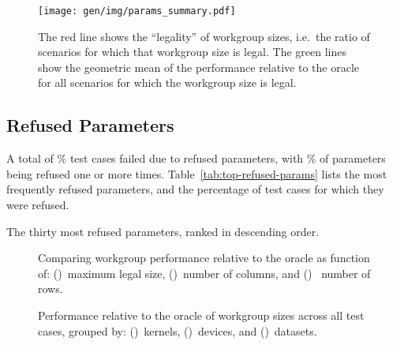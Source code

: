 \begin{figure}
\centering
\texttt{[image: gen/img/params\_summary.pdf]}
\caption{%
  The red line shows the ``legality'' of workgroup sizes, i.e.\ the
  ratio of scenarios for which that workgroup size is legal.  The
  green lines show the geometric mean of the performance relative to
  the oracle for all scenarios for which the workgroup size is legal.%
}
\label{fig:performance-legality}
\end{figure}

\subsection{Refused Parameters}

A total of \% test cases failed
due to refused parameters, with \% of
parameters being refused one or more
times. Table~\ref{tab:top-refused-params} lists the most frequently
refused parameters, and the percentage of test cases for which they
were refused.



\begin{table}
\parbox{.32\linewidth}{
    \centering
    \scriptsize
    
  }
  \hfill
  \parbox{.32\linewidth}{
    \centering
    \scriptsize
    
  }
  \hfill
  \parbox{.32\linewidth}{
    \centering
    \scriptsize
    
  }
  \caption{The thirty most refused parameters, ranked in descending
    order.}
  \label{tab:top-refused-params}
\end{table}

\cleardoublepage
\begin{figure}

\caption{%
  Comparing workgroup performance relative to the oracle as function
  of: ()~maximum legal size,
  ()~number of columns, and
  ()~ number of rows.%
}
\label{fig:performance-wgsizes}
\end{figure}

\begin{figure}

\caption{%
  Performance relative to the oracle of workgroup sizes across all
  test cases, grouped by: ()~kernels,
  ()~devices, and
  ()~datasets.%
}
\label{fig:performances}
\end{figure}


